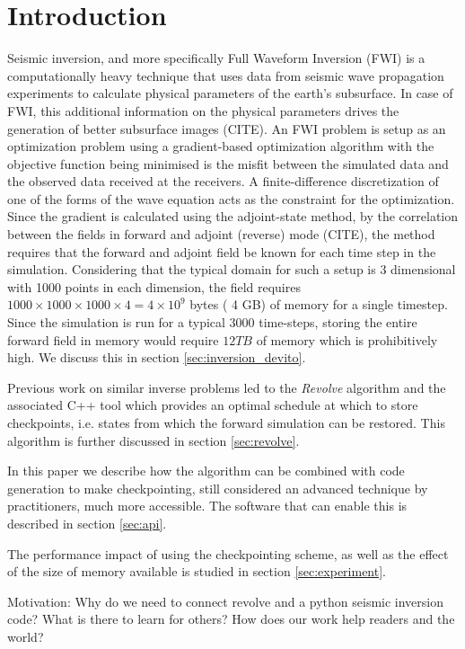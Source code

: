 \documentclass[sigconf]{acmart}
\begin{document}
\section{Introduction}
Seismic inversion, and more specifically Full Waveform Inversion (FWI)
is a computationally heavy technique that uses data from seismic wave
propagation experiments to calculate physical parameters of the
earth's subsurface. In case of FWI, this additional information on the
physical parameters drives the generation of better subsurface
images (CITE). An FWI problem is setup as an optimization problem using
a gradient-based optimization algorithm with the objective function
being minimised is the misfit between the simulated data and the
observed data received at the receivers. A finite-difference
discretization of one of the forms of the wave equation acts as the
constraint for the optimization. Since the gradient is calculated using the
adjoint-state method, by the correlation between the fields in forward
and adjoint (reverse) mode (CITE), the method requires that the forward and
adjoint field be known for each time step in the
simulation. Considering that the typical domain for such a setup is 3
dimensional with 1000 points in each dimension, the field requires
$1000 \times 1000 \times 1000 \times 4 = 4 \times 10^{9} $ bytes ( 4
GB) of memory for a single timestep. Since the simulation is run for a
typical $3000$ time-steps, storing the entire forward field in memory
would require $12 TB$ of memory which is prohibitively high. We
discuss this in section \ref{sec:inversion_devito}. 

Previous work on similar inverse problems led to the \emph{Revolve}
algorithm \cite{griewank2000} and the associated C++ tool which
provides an optimal schedule at which to store checkpoints,
i.e. states from which the forward simulation can be restored. This
algorithm is further discussed in section \ref{sec:revolve}.

In this paper we describe how the algorithm can be combined with code
generation to make checkpointing, still considered an advanced
technique by practitioners, much more accessible. The software that
can enable this is described in section \ref{sec:api}. 

The performance impact of using the checkpointing scheme, as well as
the effect of the size of memory available is studied in section
\ref{sec:experiment}. 

Motivation: Why do we need to connect revolve and a python seismic inversion code? What is there to
learn for others? How does our work help readers and the world?
\end{document}
